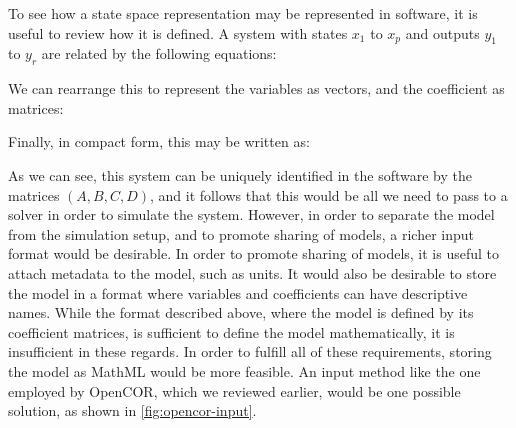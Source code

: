 \documentclass[\rootfolder/main.tex]{subfiles}
\begin{document}
To see how a state space representation may be represented in software, it is useful to review how it is defined.
A system with states $x_{1}$ to $x_{p}$ and outputs $y_{1}$ to $y_{r}$ are related by the following equations:


We can rearrange this to represent the variables as vectors, and the coefficient as matrices:

Finally, in compact form, this may be written as:

As we can see, this system can be uniquely identified in the software by the matrices $(A, B, C, D)$, and it follows that this would be all we need to pass to a solver in order to simulate the system.
However, in order to separate the model from the simulation setup, and to promote sharing of models, a richer input format would be desirable.
In order to promote sharing of models, it is useful to attach metadata to the model, such as units.
It would also be desirable to store the model in a format where variables and coefficients can have descriptive names.
While the format described above, where the model is defined by its coefficient matrices, is sufficient to define the model mathematically, it is insufficient in these regards.
In order to fulfill all of these requirements, storing the model as MathML would be more feasible.
An input method like the one employed by OpenCOR, which we reviewed earlier, would be one possible solution, as shown in \cref{fig:opencor-input}.
\end{document}
